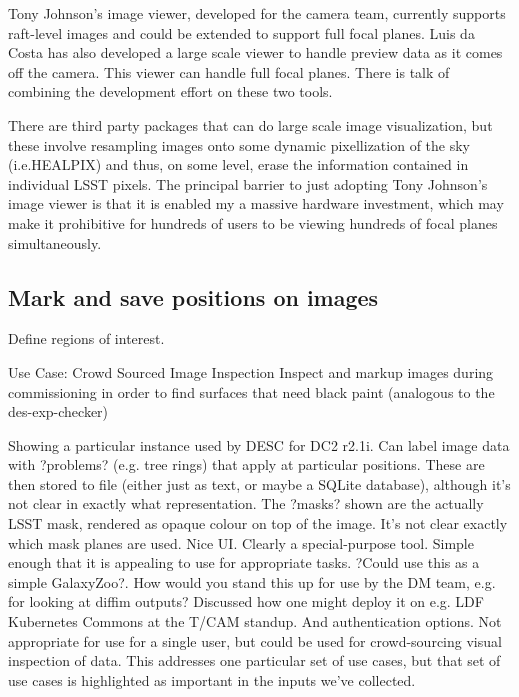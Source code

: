 Tony Johnson's image viewer, developed for the camera team, currently supports raft-level images and could be
extended to support full focal planes.  Luis da Costa has also developed a large scale viewer to handle preview
data as it comes off the camera.  This viewer can handle full focal planes.  There is talk of combining the
development effort on these two tools.

There are third party packages that can do large scale image
visualization, but these involve resampling images onto some dynamic pixellization of the sky (i.e.HEALPIX) and
thus, on some level, erase the information contained in individual LSST pixels.  The principal barrier to just
adopting Tony Johnson's image viewer is that it is enabled my a massive hardware investment, which may make it
prohibitive for hundreds of users to be viewing hundreds of focal planes simultaneously.

\subsection{Mark and save positions on images}


Define regions of interest.

Use Case: Crowd Sourced Image Inspection
Inspect and markup images during commissioning in order to find surfaces that need black paint (analogous to the des-exp-checker)


Showing a particular instance used by DESC for DC2 r2.1i.
Can label image data with ?problems? (e.g. tree rings) that apply at particular positions.
These are then stored to file (either just as text, or maybe a SQLite database), although it's not clear in exactly what representation.
The ?masks? shown are the actually LSST mask, rendered as opaque colour on top of the image.
It's not clear exactly which mask planes are used.
Nice UI.
Clearly a special-purpose tool.
Simple enough that it is appealing to use for appropriate tasks.
?Could use this as a simple GalaxyZoo?.
How would you stand this up for use by the DM team, e.g. for looking at diffim outputs?
Discussed how one might deploy it on e.g. LDF Kubernetes Commons at the T/CAM standup.
And authentication options.
Not appropriate for use for a single user, but could be used for crowd-sourcing visual inspection of data.
This addresses one particular set of use cases, but that set of use cases is highlighted as important in the inputs we've collected.

